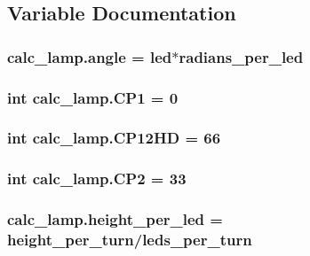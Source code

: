 \subsection{Variable Documentation}
\hypertarget{namespacecalc__lamp_a82aeed2e966856f51d4f4f92b77e2ec6}{}
\subsubsection[{angle}]{\setlength{\rightskip}{0pt plus 5cm}calc\+\_\+lamp.\+angle = led$\ast${\bf radians\+\_\+per\+\_\+led}}\label{namespacecalc__lamp_a82aeed2e966856f51d4f4f92b77e2ec6}
\hypertarget{namespacecalc__lamp_ad2861843e3b50107a862fff119d14706}{}
\subsubsection[{C\+P1}]{\setlength{\rightskip}{0pt plus 5cm}int calc\+\_\+lamp.\+C\+P1 = 0}\label{namespacecalc__lamp_ad2861843e3b50107a862fff119d14706}
\hypertarget{namespacecalc__lamp_aa57e6acb391a62bc6a5e0e2b0583b523}{}
\subsubsection[{C\+P12\+H\+D}]{\setlength{\rightskip}{0pt plus 5cm}int calc\+\_\+lamp.\+C\+P12\+H\+D = 66}\label{namespacecalc__lamp_aa57e6acb391a62bc6a5e0e2b0583b523}
\hypertarget{namespacecalc__lamp_a7fc1ee52891484d78fe8e1387481ab35}{}
\subsubsection[{C\+P2}]{\setlength{\rightskip}{0pt plus 5cm}int calc\+\_\+lamp.\+C\+P2 = 33}\label{namespacecalc__lamp_a7fc1ee52891484d78fe8e1387481ab35}
\hypertarget{namespacecalc__lamp_a99c3d189f142019bc22c5e7bdda8ddaf}{}
\subsubsection[{height\+\_\+per\+\_\+led}]{\setlength{\rightskip}{0pt plus 5cm}calc\+\_\+lamp.\+height\+\_\+per\+\_\+led = {\bf height\+\_\+per\+\_\+turn}/{\bf leds\+\_\+per\+\_\+turn}}\label{namespacecalc__lamp_a99c3d189f142019bc22c5e7bdda8ddaf}
\hypertarget{namespacecalc__lamp_aae862acf48d47d29de10038c66c88186}{}
